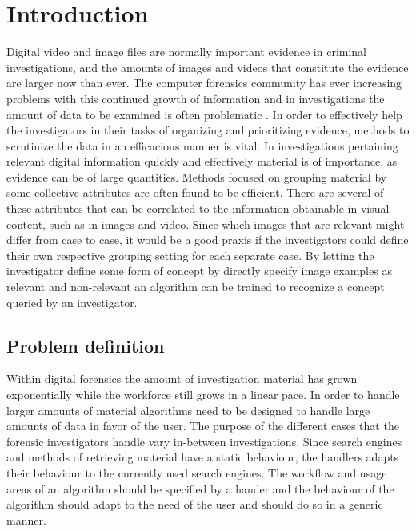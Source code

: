 \chapter{Introduction}
\label{chapter:intro}

Digital video and image files are normally important evidence in criminal investigations, and the amounts of images and videos that constitute the evidence are larger now than ever. The computer forensics community has ever increasing problems with this continued growth of information and in investigations the amount of data to be examined is often problematic \cite{dhs2011}\cite{proc2009forensics}\cite{proc2010forensics}. In order to effectively help the investigators in their tasks of organizing and prioritizing evidence, methods to scrutinize the data in an efficacious manner is vital. In investigations pertaining relevant digital information quickly and effectively material is of importance, as evidence can be of large quantities. Methods focused on grouping material by some collective attributes are often found to be efficient. There are several of these attributes that can be correlated to the information obtainable in visual content, such as in images and video. Since which images that are relevant might differ from case to case, it would be a good praxis if the investigators could define their own respective grouping setting for each separate case. By letting the investigator define some form of concept by directly specify image examples as relevant and non-relevant an algorithm can be trained to recognize a concept queried by an investigator.

\section{Problem definition}
Within digital forensics the amount of investigation material has grown exponentially while the workforce still grows in a linear pace. In order to handle larger amounts of material algorithms need to be designed to handle large amounts of data in favor of the user. The purpose of the different cases that the forensic investigators handle vary in-between investigations. Since search engines and methods of retrieving material have a static behaviour, the handlers adapts their behaviour to the currently used search engines. The workflow and usage areas of an algorithm should be specified by a hander and the behaviour of the algorithm should adapt to the need of the user and should do so in a generic manner. 

